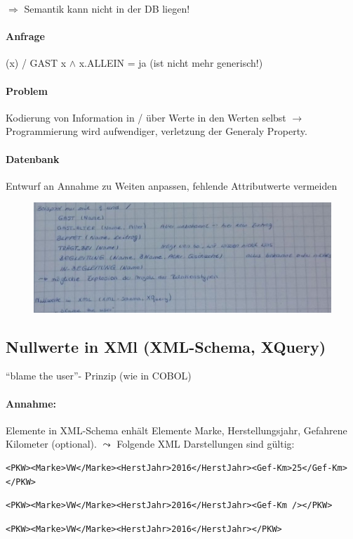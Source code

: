 \documentclass[12pt, a4paper]{article}
\begin{document}
$\Rightarrow$ Semantik kann nicht in der DB liegen!

\paragraph{Anfrage} (x) / GAST x $\wedge$ x.ALLEIN = ja (ist nicht mehr generisch!)
\paragraph{Problem} Kodierung von Information in / über Werte in den Werten selbst $\rightarrow$ Programmierung wird aufwendiger, verletzung der Generaly Property.

\paragraph{Datenbank} Entwurf an Annahme zu Weiten anpassen, fehlende Attributwerte vermeiden

\begin{figure}[h!]
\centering
\includegraphics[width=0.7\linewidth]{img/img30}
\caption{}
\label{fig:img30}
\end{figure}

\subsection*{Nullwerte in XMl (XML-Schema, XQuery)}

``blame the user''- Prinzip (wie in COBOL) \\

\paragraph{Annahme:} Elemente in XML-Schema enhält Elemente Marke, Herstellungsjahr, Gefahrene Kilometer (optional). $\leadsto$ Folgende XML Darstellungen sind gültig:

\begin{verbatim}
<PKW><Marke>VW</Marke><HerstJahr>2016</HerstJahr><Gef-Km>25</Gef-Km></PKW>
\end{verbatim}
\begin{verbatim}
<PKW><Marke>VW</Marke><HerstJahr>2016</HerstJahr><Gef-Km /></PKW>
\end{verbatim}
\begin{verbatim}
<PKW><Marke>VW</Marke><HerstJahr>2016</HerstJahr></PKW>
\end{verbatim}
\end{document}
